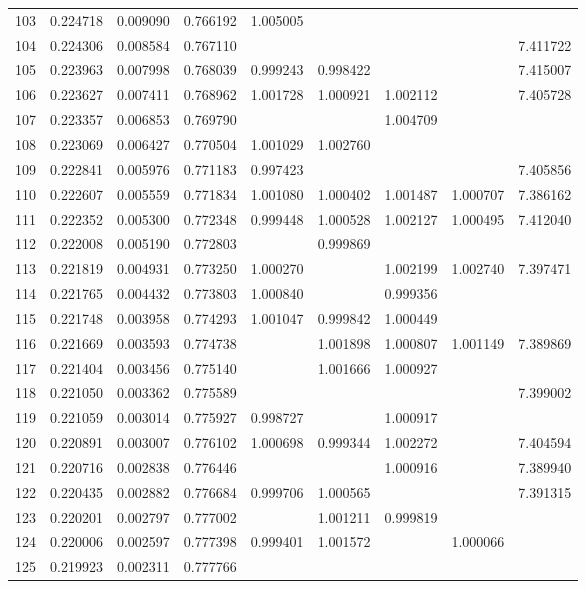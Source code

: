 \documentclass{elsarticle}
\begin{document}
\begin{center}
\begin{longtable}{|c|ccc|cccc|c|}
  103 & 0.224718 & 0.009090 & 0.766192 & 1.005005 &  &  &  &  \\
  104 & 0.224306 & 0.008584 & 0.767110 &  &  &  &  & 7.411722 \\
  105 & 0.223963 & 0.007998 & 0.768039 & 0.999243 & 0.998422 &  &  & 7.415007 \\
  106 & 0.223627 & 0.007411 & 0.768962 & 1.001728 & 1.000921 & 1.002112 &  & 7.405728 \\
  107 & 0.223357 & 0.006853 & 0.769790 &  &  & 1.004709 &  &  \\
  108 & 0.223069 & 0.006427 & 0.770504 & 1.001029 & 1.002760 &  &  &  \\
  109 & 0.222841 & 0.005976 & 0.771183 & 0.997423 &  &  &  & 7.405856 \\
  110 & 0.222607 & 0.005559 & 0.771834 & 1.001080 & 1.000402 & 1.001487 & 1.000707 & 7.386162 \\
  111 & 0.222352 & 0.005300 & 0.772348 & 0.999448 & 1.000528 & 1.002127 & 1.000495 & 7.412040 \\
  112 & 0.222008 & 0.005190 & 0.772803 &  & 0.999869 &  &  &  \\
  113 & 0.221819 & 0.004931 & 0.773250 & 1.000270 &  & 1.002199 & 1.002740 & 7.397471 \\
  114 & 0.221765 & 0.004432 & 0.773803 & 1.000840 &  & 0.999356 &  &  \\
  115 & 0.221748 & 0.003958 & 0.774293 & 1.001047 & 0.999842 & 1.000449 &  &  \\
  116 & 0.221669 & 0.003593 & 0.774738 &  & 1.001898 & 1.000807 & 1.001149 & 7.389869 \\
  117 & 0.221404 & 0.003456 & 0.775140 &  & 1.001666 & 1.000927 &  &  \\
  118 & 0.221050 & 0.003362 & 0.775589 &  &  &  &  & 7.399002 \\
  119 & 0.221059 & 0.003014 & 0.775927 & 0.998727 &  & 1.000917 &  &  \\
  120 & 0.220891 & 0.003007 & 0.776102 & 1.000698 & 0.999344 & 1.002272 &  & 7.404594 \\
  121 & 0.220716 & 0.002838 & 0.776446 &  &  & 1.000916 &  & 7.389940 \\
  122 & 0.220435 & 0.002882 & 0.776684 & 0.999706 & 1.000565 &  &  & 7.391315 \\
  123 & 0.220201 & 0.002797 & 0.777002 &  & 1.001211 & 0.999819 &  &  \\
  124 & 0.220006 & 0.002597 & 0.777398 & 0.999401 & 1.001572 &  & 1.000066 &  \\
  125 & 0.219923 & 0.002311 & 0.777766 &  &  &  &  &
\label{tab:data}
\end{longtable}
\end{center}
\end{document}
